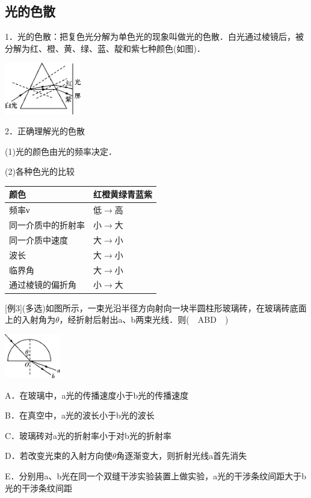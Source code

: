 \subsection{光的色散}

1．光的色散：把复色光分解为单色光的现象叫做光的色散．白光通过棱镜后，被分解为红、橙、黄、绿、蓝、靛和紫七种颜色(如图)．

\begin{center}\includegraphics[width=1.31111in,height=0.88681in]{media/image550.png}\end{center}
2．正确理解光的色散

(1)光的颜色由光的频率决定．

(2)各种色光的比较

\begin{longtable}[]{@{}ll@{}}
\toprule
颜色 & 红橙黄绿青蓝紫\tabularnewline
\midrule
\endhead
频率ν & 低$\rightarrow$高\tabularnewline
同一介质中的折射率 & 小$\rightarrow$大\tabularnewline
同一介质中速度 & 大$\rightarrow$小\tabularnewline
波长 & 大$\rightarrow$小\tabularnewline
临界角 & 大$\rightarrow$小\tabularnewline
通过棱镜的偏折角 & 小$\rightarrow$大\tabularnewline
\bottomrule
\end{longtable}

{[}例3{]}(多选)如图所示，一束光沿半径方向射向一块半圆柱形玻璃砖，在玻璃砖底面上的入射角为$\theta$，经折射后射出a、b两束光线．则(　ABD　)

\begin{center}\includegraphics[width=0.9625in,height=0.76389in]{media/image551.png}\end{center}
A．在玻璃中，a光的传播速度小于b光的传播速度

B．在真空中，a光的波长小于b光的波长

C．玻璃砖对a光的折射率小于对b光的折射率

D．若改变光束的入射方向使$\theta$角逐渐变大，则折射光线a首先消失

E．分别用a、b光在同一个双缝干涉实验装置上做实验，a光的干涉条纹间距大于b光的干涉条纹间距

